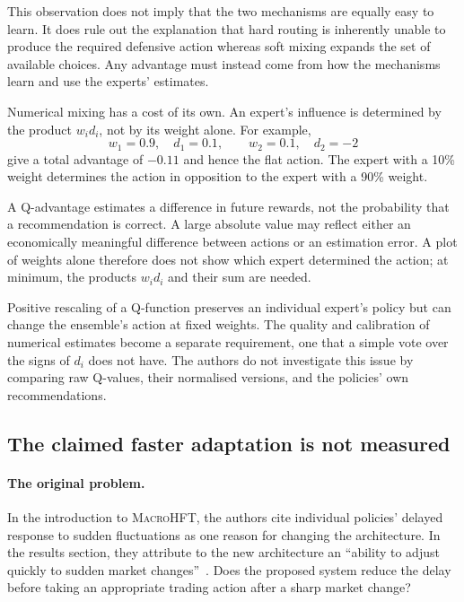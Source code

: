 \documentclass[9pt,a4paper,twocolumn]{extarticle}
\newcommand{\Macro}{\textsc{MacroHFT}}
\begin{document}
This observation does not imply that the two mechanisms are equally easy to learn. It does rule
out the explanation that hard routing is inherently unable to produce the required defensive
action whereas soft mixing expands the set of available choices. Any advantage must instead come
from how the mechanisms learn and use the experts' estimates.

Numerical mixing has a cost of its own. An expert's influence is determined by the product $w_i
d_i$, not by its weight alone. For example,
\[
  w_1=0.9,\quad d_1=0.1,
  \qquad
  w_2=0.1,\quad d_2=-2
\]
give a total advantage of $-0.11$ and hence the flat action. The expert with a 10\% weight
determines the action in opposition to the expert with a 90\% weight.

A Q-advantage estimates a difference in future rewards, not the probability that a recommendation
is correct. A large absolute value may reflect either an economically meaningful difference
between actions or an estimation error. A plot of weights alone therefore does not show which
expert determined the action; at minimum, the products $w_i d_i$ and their sum are needed.

Positive rescaling of a Q-function preserves an individual expert's policy but can change the
ensemble's action at fixed weights. The quality and calibration of numerical estimates become a
separate requirement, one that a simple vote over the signs of $d_i$ does not have. The authors
do not investigate this issue by comparing raw Q-values, their normalised versions, and the
policies' own recommendations.

\subsection{The claimed faster adaptation is not measured}
\label{sec:adaptation_claim}

\paragraph{The original problem.}

In the introduction to \Macro{}, the authors cite individual policies' delayed response to sudden
fluctuations as one reason for changing the architecture. In the results section, they attribute
to the new architecture an \foreignlanguage{english}{\enquote{ability to adjust quickly to sudden
market changes}}~\cite{zong2024macrohft}. Does the proposed system reduce the delay before taking
an appropriate trading action after a sharp market change?
\end{document}
